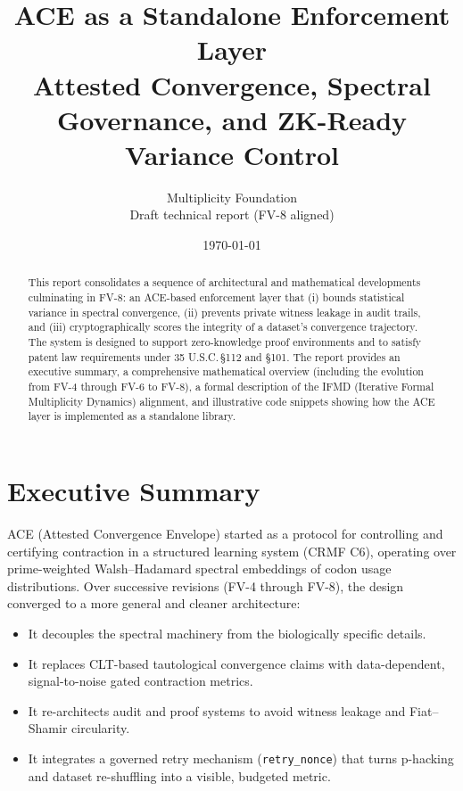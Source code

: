 \documentclass[11pt]{article}
\title{ACE as a Standalone Enforcement Layer\\
Attested Convergence, Spectral Governance, and ZK-Ready Variance Control}
\author{Multiplicity Foundation\\
\vspace{0.25em}
\small{Draft technical report (FV-8 aligned)}}
\date{\today}
\begin{document}
\maketitle

\begin{abstract}
This report consolidates a sequence of architectural and mathematical developments culminating in FV-8: an ACE-based enforcement layer that (i) bounds statistical variance in spectral convergence, (ii) prevents private witness leakage in audit trails, and (iii) cryptographically scores the integrity of a dataset's convergence trajectory. The system is designed to support zero-knowledge proof environments and to satisfy patent law requirements under 35 U.S.C.\,§112 and §101. The report provides an executive summary, a comprehensive mathematical overview (including the evolution from FV-4 through FV-6 to FV-8), a formal description of the IFMD (Iterative Formal Multiplicity Dynamics) alignment, and illustrative code snippets showing how the ACE layer is implemented as a standalone library.
\end{abstract}

\tableofcontents

\newpage

\section{Executive Summary}

ACE (Attested Convergence Envelope) started as a protocol for controlling and certifying contraction in a structured learning system (CRMF C6), operating over prime-weighted Walsh--Hadamard spectral embeddings of codon usage distributions. Over successive revisions (FV-4 through FV-8), the design converged to a more general and cleaner architecture:

\begin{itemize}[nosep]
  \item It decouples the spectral machinery from the biologically specific details.
  \item It replaces CLT-based tautological convergence claims with data-dependent, signal-to-noise gated contraction metrics.
  \item It re-architects audit and proof systems to avoid witness leakage and Fiat--Shamir circularity.
  \item It integrates a governed retry mechanism (\texttt{retry\_nonce}) that turns p-hacking and dataset re-shuffling into a visible, budgeted metric.
\end{itemize}
\end{document}
